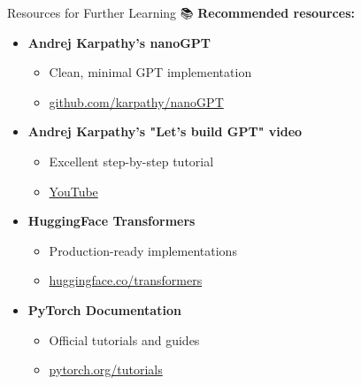 \documentclass[aspectratio=169]{beamer}
\begin{document}
\begin{frame}[shrink=10]{Resources for Further Learning 📚}
    \textbf{Recommended resources:}

    \vspace{0.3cm}

    \begin{itemize}\setlength{\itemsep}{0pt}
        \item \textbf{Andrej Karpathy's nanoGPT}
        \begin{itemize}\setlength{\itemsep}{0pt}
            \item Clean, minimal GPT implementation
            \item \href{https://github.com/karpathy/nanoGPT}{github.com/karpathy/nanoGPT}
        \end{itemize}

        \item \textbf{Andrej Karpathy's "Let's build GPT" video}
        \begin{itemize}\setlength{\itemsep}{0pt}
            \item Excellent step-by-step tutorial
            \item \href{https://www.youtube.com/watch?v=kCc8FmEb1nY}{YouTube}
        \end{itemize}

        \item \textbf{HuggingFace Transformers}
        \begin{itemize}\setlength{\itemsep}{0pt}
            \item Production-ready implementations
            \item \href{https://huggingface.co/transformers}{huggingface.co/transformers}
        \end{itemize}

        \item \textbf{PyTorch Documentation}
        \begin{itemize}\setlength{\itemsep}{0pt}
            \item Official tutorials and guides
            \item \href{https://pytorch.org/tutorials}{pytorch.org/tutorials}
        \end{itemize}
    \end{itemize}
\end{frame}
\end{document}
